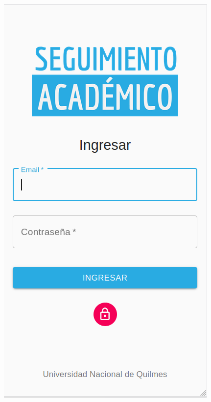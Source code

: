 \begin{figure}[!htbp]
  \centering
    \includegraphics[scale=0.3]{images/seguimiento-academico/sa-mobile-login.png}
  \label{fig:sa-login-mobile}
\end{figure}

